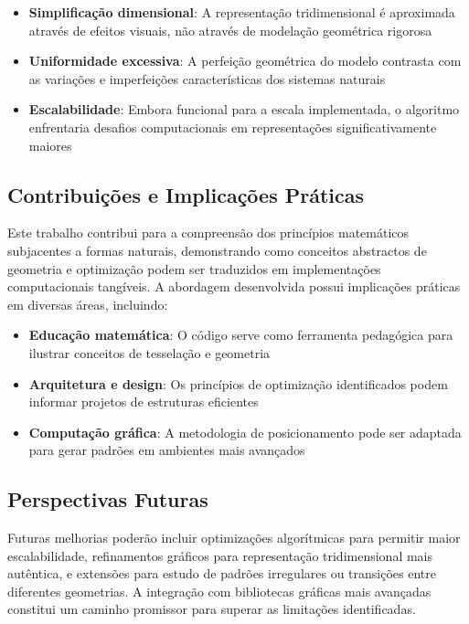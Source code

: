\documentclass[12pt,a4paper,oneside]{extarticle}
\begin{document}
\begin{itemize}
    \item \textbf{Simplificação dimensional}: A representação tridimensional é aproximada através de efeitos visuais, não através de modelação geométrica rigorosa
    \item \textbf{Uniformidade excessiva}: A perfeição geométrica do modelo contrasta com as variações e imperfeições características dos sistemas naturais
    \item \textbf{Escalabilidade}: Embora funcional para a escala implementada, o algoritmo enfrentaria desafios computacionais em representações significativamente maiores
\end{itemize}

\subsection{Contribuições e Implicações Práticas}

Este trabalho contribui para a compreensão dos princípios matemáticos subjacentes a formas naturais, demonstrando como conceitos abstractos de geometria e optimização podem ser traduzidos em implementações computacionais tangíveis. A abordagem desenvolvida possui implicações práticas em diversas áreas, incluindo:

\begin{itemize}
    \item \textbf{Educação matemática}: O código serve como ferramenta pedagógica para ilustrar conceitos de tesselação e geometria
    \item \textbf{Arquitetura e design}: Os princípios de optimização identificados podem informar projetos de estruturas eficientes
    \item \textbf{Computação gráfica}: A metodologia de posicionamento pode ser adaptada para gerar padrões em ambientes mais avançados
\end{itemize}

\subsection{Perspectivas Futuras}

Futuras melhorias poderão incluir optimizações algorítmicas para permitir maior escalabilidade, refinamentos gráficos para representação tridimensional mais autêntica, e extensões para estudo de padrões irregulares ou transições entre diferentes geometrias. A integração com bibliotecas gráficas mais avançadas constitui um caminho promissor para superar as limitações identificadas.
\end{document}
